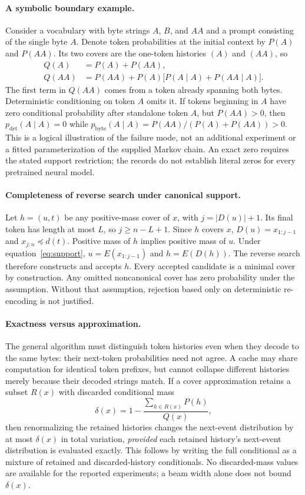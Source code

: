 \documentclass{article}
\newcommand{\dec}{D}
\newcommand{\enc}{E}
\newcommand{\pref}{\preceq}
\begin{document}
\paragraph{A symbolic boundary example.}
Consider a vocabulary with byte strings $A$, $B$, and $AA$ and a prompt consisting of the single byte $A$. Denote token probabilities at the initial context by $P(A)$ and $P(AA)$. Its two covers are the one-token histories $(A)$ and $(AA)$, so
\begin{align}
 Q(A)&=P(A)+P(AA),\\
 Q(AA)&=P(AA)+P(A)\bigl[P(A\mid A)+P(AA\mid A)\bigr].
\end{align}
The first term in $Q(AA)$ comes from a token already spanning both bytes. Deterministic conditioning on token $A$ omits it. If tokens beginning in $A$ have zero conditional probability after standalone token $A$, but $P(AA)>0$, then $p_{\mathrm{det}}(A\mid A)=0$ while
$p_{\mathrm{byte}}(A\mid A)=P(AA)/(P(A)+P(AA))>0$.
This is a logical illustration of the failure mode, not an additional experiment or a fitted parameterization of the supplied Markov chain. An exact zero requires the stated support restriction; the records do not establish literal zeros for every pretrained neural model.

\paragraph{Completeness of reverse search under canonical support.}
Let $h=(u,t)$ be any positive-mass cover of $x$, with $j=|\dec(u)|+1$. Its final token has length at most $L$, so $j\geq n-L+1$. Since $h$ covers $x$, $\dec(u)=x_{1:j-1}$ and $x_{j:n}\pref d(t)$. Positive mass of $h$ implies positive mass of $u$. Under equation~\ref{eq:support}, $u=\enc(x_{1:j-1})$ and $h=\enc(\dec(h))$. The reverse search therefore constructs and accepts $h$. Every accepted candidate is a minimal cover by construction. Any omitted noncanonical cover has zero probability under the assumption. Without that assumption, rejection based only on deterministic re-encoding is not justified.

\paragraph{Exactness versus approximation.}
The general algorithm must distinguish token histories even when they decode to the same bytes: their next-token probabilities need not agree. A cache may share computation for identical token prefixes, but cannot collapse different histories merely because their decoded strings match. If a cover approximation retains a subset $R(x)$ with discarded conditional mass
\begin{equation}
 \delta(x)=1-\frac{\sum_{h\in R(x)}P(h)}{Q(x)},
\end{equation}
then renormalizing the retained histories changes the next-event distribution by at most $\delta(x)$ in total variation, \emph{provided} each retained history's next-event distribution is evaluated exactly. This follows by writing the full conditional as a mixture of retained and discarded-history conditionals. No discarded-mass values are available for the reported experiments; a beam width alone does not bound $\delta(x)$.
\end{document}
